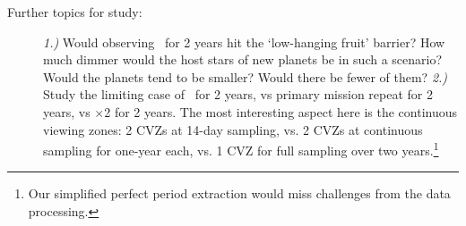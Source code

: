 \begin{description}
	\item[Further topics for study:]
	\textit{1.)}
	Would observing \npole\ for 2 years hit the `low-hanging fruit' barrier?
	How much dimmer would the host stars of new planets be in such a scenario?
	Would the planets tend to be smaller?
	Would there be fewer of them?
	\textit{2.)}
	Study the limiting case of \hemis\ for 2 years, vs primary mission repeat for 2 years, vs \npole$\times$2 for 2 years. The most interesting aspect here is the continuous viewing zones: 2 CVZs at 14-day sampling, vs. 2 CVZs at continuous sampling for one-year each, vs. 1 CVZ for full sampling over two years.\footnote{Our simplified perfect period extraction would miss challenges from the data processing.}
\end{description}